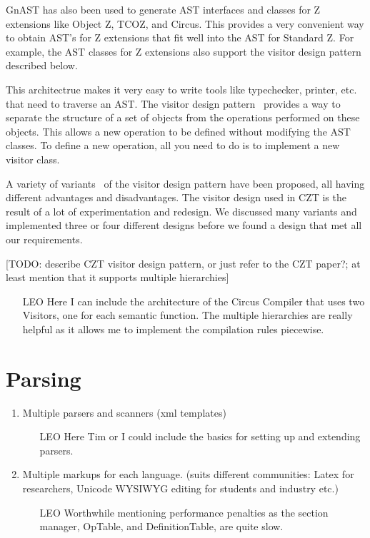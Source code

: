 \documentclass{llncs}
\begin{document}
  GnAST has also been used to generate AST interfaces and classes for
  Z extensions like Object Z, TCOZ, and Circus.  This provides a very
  convenient way to obtain AST's for Z extensions that fit well into
  the AST for Standard Z.  For example, the AST classes for Z
  extensions also support the visitor design pattern described below.

  This architectrue makes it very easy to write tools like
  typechecker, printer, etc. that need to traverse an AST.  The
  visitor design pattern~\cite{GamEA:95} provides a way to separate
  the structure of a set of objects from the operations performed on
  these objects.  This allows a new operation to be defined without
  modifying the AST classes.  To define a new operation, all you need
  to do is to implement a new visitor class.

  A variety of variants~\cite{MaiCha:01} of the visitor design pattern
  have been proposed, all having different advantages and
  disadvantages.  The visitor design used in CZT is the result of a
  lot of experimentation and redesign.  We discussed many variants and
  implemented three or four different designs before we found a design
  that met all our requirements.

  [TODO: describe CZT visitor design pattern, or just refer to the CZT
  paper?; at least mention that it supports multiple hierarchies]


  \begin{itemize}
    \item[LEO] Here I can include the architecture of the Circus
      Compiler that uses two Visitors, one for each semantic function.
      The multiple hierarchies are really helpful as it allows me to
      implement the compilation rules piecewise.
  \end{itemize}

\section{Parsing}

  \begin{enumerate}
    \item Multiple parsers and scanners (xml templates)
        \begin{itemize}
            \item[LEO] Here Tim or I could include the basics for setting up and extending parsers.
        \end{itemize}

    \item Multiple markups for each language.
      (suits different communities:  Latex for researchers,
      Unicode WYSIWYG editing for students and industry etc.)
      \begin{itemize}
         \item[LEO] Worthwhile mentioning performance penalties as the section manager,
                OpTable, and DefinitionTable, are quite slow.
      \end{itemize}
  \end{enumerate}
\end{document}
